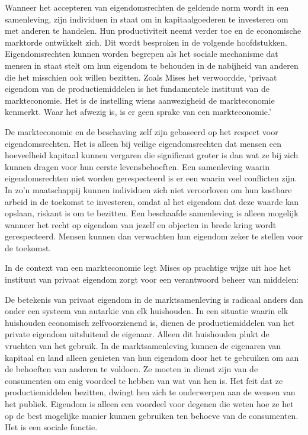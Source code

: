 Wanneer het accepteren van eigendomsrechten de geldende norm wordt in een samenleving, zijn individuen in staat om in kapitaalgoederen te investeren om met anderen te handelen. Hun productiviteit neemt verder toe en de economische marktorde ontwikkelt zich. Dit wordt besproken in de volgende hoofdstukken. Eigendomsrechten kunnen worden begrepen als het sociale mechanisme dat mensen in staat stelt om hun eigendom te behouden in de nabijheid van anderen die het misschien ook willen bezitten. Zoals Mises het verwoordde, `privaat eigendom van de productiemiddelen is het fundamentele instituut van de markteconomie. Het is de instelling wiens aanwezigheid de markteconomie kenmerkt. Waar het afwezig is, is er geen sprake van een markteconomie.'\autocite{55}

De markteconomie en de beschaving zelf zijn gebaseerd op het respect voor eigendomsrechten. Het is alleen bij veilige eigendomsrechten dat mensen een hoeveelheid kapitaal kunnen vergaren die significant groter is dan wat ze bij zich kunnen dragen voor hun eerste levensbehoeften. Een samenleving waarin eigendomsrechten niet worden gerespecteerd is er een waarin veel conflicten zijn. In zo'n maatschappij kunnen individuen zich niet veroorloven om hun kostbare arbeid in de toekomst te investeren, omdat al het eigendom dat deze waarde kan opslaan, riskant is om te bezitten. Een beschaafde samenleving is alleen mogelijk wanneer het recht op eigendom van jezelf en objecten in brede kring wordt gerespecteerd. Mensen kunnen dan verwachten hun eigendom zeker te stellen voor de toekomst.

In de context van een markteconomie legt Mises op prachtige wijze uit hoe het instituut van privaat eigendom zorgt voor een verantwoord beheer van middelen:

\begin{blockquotebox}
    De betekenis van privaat eigendom in de marktsamenleving is radicaal anders dan onder een systeem van autarkie van elk huishouden. In een situatie waarin elk huishouden economisch zelfvoorzienend is, dienen de productiemiddelen van het private eigendom uitsluitend de eigenaar. Alleen dit huishouden plukt de vruchten van het gebruik. In de marktsamenleving kunnen de eigenaren van kapitaal en land alleen genieten van hun eigendom door het te gebruiken om aan de behoeften van anderen te voldoen. Ze moeten in dienst zijn van de consumenten om enig voordeel te hebben van wat van hen is. Het feit dat ze productiemiddelen bezitten, dwingt hen zich te onderwerpen aan de wensen van het publiek. Eigendom is alleen een voordeel voor degenen die weten hoe ze het op de best mogelijke manier kunnen gebruiken ten behoeve van de consumenten. Het is een sociale functie.\footnotemark
\end{blockquotebox}


